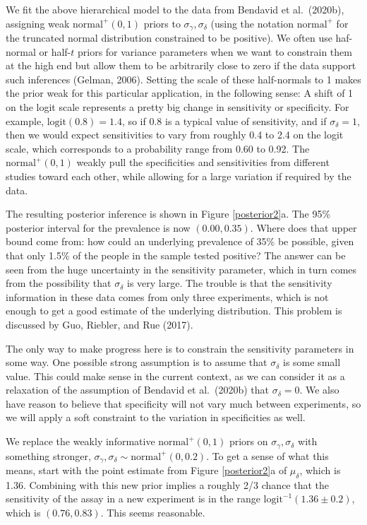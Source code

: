 \documentclass[11pt]{article}
\begin{document}
We  fit the above hierarchical model to the data from Bendavid et al.\ (2020b), assigning weak $\mbox{normal}^+(0,1)$ priors to $\sigma_{\gamma},\sigma_{\delta}$ (using the notation $\mbox{normal}^+$ for the truncated normal distribution constrained to be positive).  We often use haf-normal or half-$t$ priors for variance parameters when we want to constrain them at the high end but allow them to be arbitrarily close to zero if the data support such inferences (Gelman, 2006).  Setting the scale of these half-normals to 1 makes the prior weak for this particular application, in the following sense:  A shift of 1 on the logit scale represents a pretty big change in sensitivity or specificity.  For example, $\mbox{logit}(0.8)=1.4$, so if 0.8 is a typical value of sensitivity, and if $\sigma_{\delta}=1$, then we would expect sensitivities to vary from roughly 0.4 to 2.4 on the logit scale, which corresponds to a probability range from 0.60 to 0.92.  The $\mbox{normal}^+(0,1)$ weakly pull the specificities and sensitivities from different studies toward each other, while allowing for a large variation if required by the data.

The resulting posterior inference is shown in Figure \ref{posterior2}a.  The 95\% posterior interval for the prevalence is now $(0.00, 0.35)$.  Where does that upper bound come from:  how could an underlying prevalence of 35\% be possible, given that only 1.5\% of the people in the sample tested positive?  The answer can be seen from the huge uncertainty in the sensitivity parameter, which in turn comes from the possibility that $\sigma_{\delta}$ is very large.  The trouble is that the sensitivity information in these data comes from only three experiments, which is not enough to get a good estimate of the underlying distribution.  This problem is discussed by Guo, Riebler, and Rue (2017).

The only way to make progress here is to constrain the sensitivity parameters in some way.  One possible strong assumption is to assume that $\sigma_{\delta}$ is some small value.  This could make sense in the current context, as we can consider it as a relaxation of the assumption of Bendavid et al.\ (2020b) that $\sigma_{\delta} = 0$.  We also have reason to believe that specificity will not vary much between experiments, so we will apply a soft constraint to the variation in specificities as well.

We replace the weakly informative $\mbox{normal}^+(0, 1)$ priors on $\sigma_{\gamma},\sigma_{\delta}$ with something stronger,
$\sigma_{\gamma}, \sigma_{\delta}\sim\mbox{normal}^+(0, 0.2)$.  To get a sense of what this means, start with the point estimate from Figure \ref{posterior2}a of $\mu_{\delta}$, which is 1.36. Combining with this new prior implies a roughly 2/3 chance that the sensitivity of the assay in a new experiment is in the range $\mbox{logit}^{-1}(1.36 \pm 0.2)$, which is $(0.76, 0.83)$. This seems reasonable.
\end{document}
